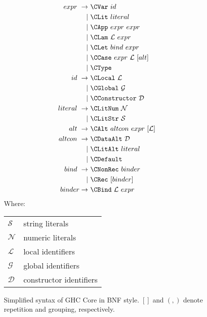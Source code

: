 \begin{figure}
  \begin{equation*}
    \begin{split}
      expr\    \rightarrow\ & \CVar\ id                          \\
                         |\ & \CLit\ literal                     \\
                         |\ & \CApp\ expr\ expr                  \\
                         |\ & \CLam\ \mathcal{L}\ expr           \\
                         |\ & \CLet\ bind\ expr                  \\
                         |\ & \CCase\ expr\ \mathcal{L}\ [alt]   \\
                         |\ & \CType                             \\
      id\      \rightarrow\ & \CLocal\       \mathcal{L}         \\
                         |\ & \CGlobal\      \mathcal{G}         \\
                         |\ & \CConstructor\ \mathcal{D}         \\
      literal\ \rightarrow\ & \CLitNum\ \mathcal{N}              \\
                         |\ & \CLitStr\ \mathcal{S}              \\
      alt\     \rightarrow\ & \CAlt\ altcon\ expr\ [\mathcal{L}] \\
      altcon\  \rightarrow\ & \CDataAlt\ \mathcal{D}             \\
                         |\ & \CLitAlt\ literal                  \\
                         |\ & \CDefault                          \\
      bind\    \rightarrow\ & \CNonRec\ binder                   \\
                         |\ & \CRec\ [binder]                    \\
      binder   \rightarrow\ & \CBind\ \mathcal{L}\ expr
    \end{split}
  \end{equation*}
  Where:
  \begin{tabular}[t]{l @{ $=$ } l}
    $\mathcal{S}$ & string literals    \\
    $\mathcal{N}$ & numeric literals   \\
    $\mathcal{L}$ & local identifiers  \\
    $\mathcal{G}$ & global identifiers \\
    $\mathcal{D}$ & constructor identifiers
  \end{tabular}

  \caption{Simplified syntax of GHC Core in BNF style. $[]$ and $(,)$ denote
    repetition and grouping, respectively.}
  \label{fig:coresyntax}
\end{figure}

